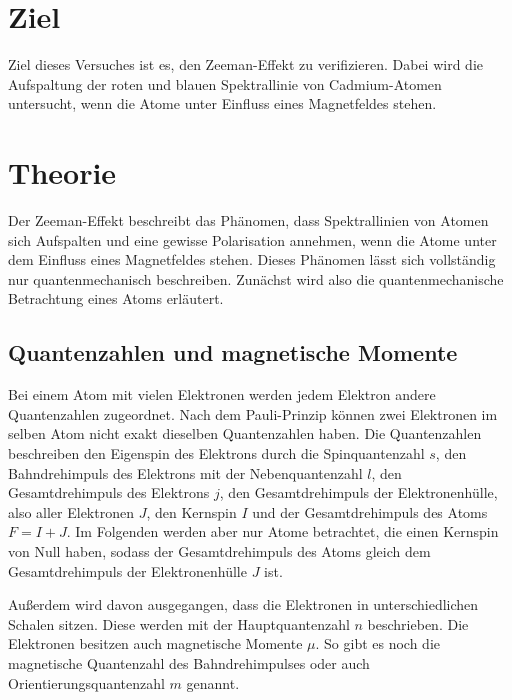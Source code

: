\section{Ziel}
\label{sec:Ziel}
Ziel dieses Versuches ist es, den Zeeman-Effekt zu verifizieren. 
Dabei wird die Aufspaltung der roten und blauen Spektrallinie von Cadmium-Atomen untersucht, wenn
die Atome unter Einfluss eines Magnetfeldes stehen.

\section{Theorie}
\label{sec:Theorie}


Der Zeeman-Effekt beschreibt das Phänomen, dass Spektrallinien von Atomen sich Aufspalten und eine 
gewisse Polarisation annehmen, wenn die Atome unter dem Einfluss eines Magnetfeldes stehen. 
Dieses Phänomen lässt sich vollständig nur quantenmechanisch beschreiben. 
Zunächst wird also die quantenmechanische Betrachtung eines Atoms erläutert.


\subsection{Quantenzahlen und magnetische Momente}

Bei einem Atom mit vielen Elektronen werden jedem Elektron andere Quantenzahlen zugeordnet. Nach dem 
Pauli-Prinzip können zwei Elektronen im selben Atom nicht exakt dieselben Quantenzahlen haben. 
Die Quantenzahlen beschreiben den Eigenspin des Elektrons durch die Spinquantenzahl $s$, den Bahndrehimpuls 
des Elektrons mit der Nebenquantenzahl $l$, den 
Gesamtdrehimpuls des Elektrons $j$, den Gesamtdrehimpuls der Elektronenhülle, also aller Elektronen $J$, 
den Kernspin $I$ und der Gesamtdrehimpuls des Atoms $F = I + J$. Im Folgenden werden aber nur Atome 
betrachtet, die einen Kernspin von Null haben, sodass der Gesamtdrehimpuls des Atoms gleich dem 
Gesamtdrehimpuls der Elektronenhülle $J$ ist.

Außerdem wird davon ausgegangen, dass die Elektronen in unterschiedlichen Schalen sitzen. Diese werden 
mit der Hauptquantenzahl $n$ beschrieben.
Die Elektronen besitzen auch magnetische Momente $\mu$. So gibt es noch die magnetische Quantenzahl 
des Bahndrehimpulses oder auch Orientierungsquantenzahl $m$ genannt.

